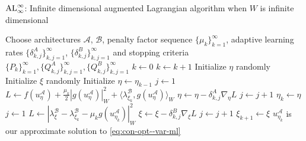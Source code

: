 \begin{algorithm}[!ht]
\caption{${\rm AL}_\infty^\infty$: Infinite dimensional augmented Lagrangian algorithm when $W$ is infinite dimensional}
\label{algo:dl-al-infinite--var-ml}
\begin{algorithmic}[1]
    \STATE Choose architectures $\mathcal A$, $\mathcal B$, penalty factor sequence $\{\mu_k\}_{k=1}^\infty$, adaptive learning rates $\{\delta_{k,j}^A\}_{k,j=1}^\infty$, $\{\delta_{k, j}^B\}_{k,j=1}^\infty$ and stopping criteria $\{P_k\}_{k=1}^\infty, \{Q_{k,j}^A\}_{k, j=1}^\infty, \{Q_{k,j}^B\}_{k, j=1}^\infty$
    \STATE $k\leftarrow0$
        \STATE $k \leftarrow k+1$
                \STATE Initialize $\eta$ randomly
                \STATE Initialize $\xi$ randomly
            \ELSE
                \STATE Initialize $\eta\leftarrow \eta_{k-1}$
        \ENDIF
        \STATE $j\leftarrow 1$
            \STATE $L\leftarrow f(u_{\eta}^{\mathcal A})+\frac{\mu_k}{2}|g(u_{\eta}^{\mathcal A})|^2_W + \langle\lambda_{\xi_k}^{\mathcal B}, g(u_{\eta}^{\mathcal A})\rangle_W$
            \STATE $\eta\leftarrow\eta-\delta_{k,j}^A\nabla_\eta L$
            \STATE $j\leftarrow j+1$
        \ENDWHILE
        \STATE $\eta_k\leftarrow\eta$
        \STATE $j\leftarrow 1$
            \STATE $L\leftarrow \left|\lambda_{\xi}^{\mathcal B}-\lambda_{\xi_{k}}^{\mathcal B}-\mu_{k} g(u_{\eta_{k}}^{\mathcal A})\right|_W^2$
            \STATE $\xi\leftarrow\xi-\delta_{k,j}^B\nabla_\xi L$
            \STATE $j\leftarrow j+1$
        \ENDWHILE
        \STATE $\xi_{k+1}\leftarrow\xi$
    \ENDWHILE
    \STATE $u_{\eta_k}^{\mathcal A}$ is our approximate solution to \eqref{eq:con-opt--var-ml}
\end{algorithmic}
\end{algorithm}


